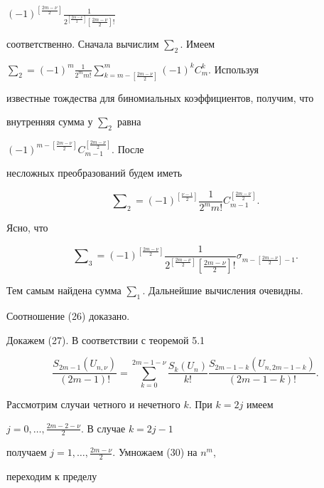 \begin{pf}
$(-1)^{[\frac{2m-\nu}{2}]}\frac{1} 


{2^{[\frac{2m-\nu}{2}]}[\frac{2m-\nu}{2}]!}$ 


соответственно. Сначала вычислим $\sum_2$. Имеем 


$\sum_2=(-1)^m\frac{1}{2^m m!} 


\sum\limits^m_{k=m-[\frac{2m-\nu}{2}]}(-1)^k C^k_m$. Используя 


известные тождества для биномиальных коэффициентов, получим, что 


внутренняя сумма у $\sum_2$ равна 


$(-1)^{m-[\frac{2m-\nu}{2}]}C^{[\frac{2m-\nu}{2}]}_{m-1}$. После 


несложных преобразований будем иметь 


$$ 


\sum\nolimits_2=(-1)^{[\frac{\nu-1}{2}]}\frac{1}{2^m m!} 


C^{[\frac{2m-\nu}{2}]}_{m-1}.


$$ 


Ясно, что 


$$ 


\sum\nolimits_3=(-1)^{[\frac{2m-\nu}{2}]} 


\frac{1}{2^{[\frac{2m-\nu}{2}]}[\frac{2m-\nu}{2}]!} 


\sigma_{m-[\frac{2m-\nu}{2}]-1}. 


$$ 


Тем самым найдена сумма $\sum_1$. Дальнейшие вычисления очевидны. 


Соотношение (26) доказано. 


 


Докажем (27). В соответствии с теоремой 5.1 \cite{4} 


\begin{equation} 


\frac{S_{2m-1}(U_{n,\nu})}{(2m-1)!}= 


\sum^{2m-1-\nu}_{k=0}\frac{S_k(U_n)}{k!} 


\frac{S_{2m-1-k}(U_{n,2m-1-k})}{(2m-1-k)!}. 


\end{equation} 


Рассмотрим случаи четного и нечетного $k$. При $k=2j$ имеем 


$j=0,\dotsc,\frac{2m-2-\nu}{2}$. В случае $k=2j-1$ 


получаем $j=1,\dotsc,\frac{2m-\nu}{2}$. Умножаем (30) на $n^m$, 


переходим к пределу 



\end{pf}
